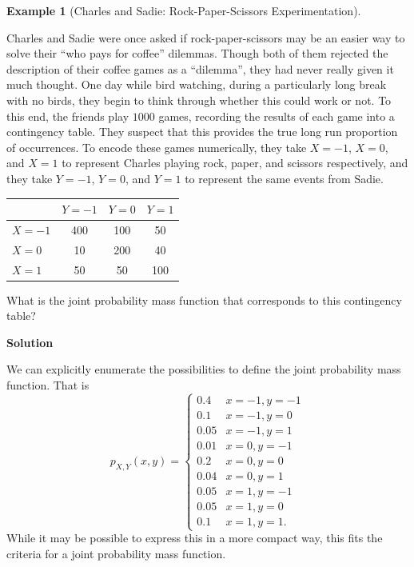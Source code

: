 \documentclass[
  letterpaper,
  DIV=11,
  numbers=noendperiod]{scrreprt}
\theoremstyle{definition}
\theoremstyle{definition}
\theoremstyle{definition}
\newtheorem{example}{Example}[chapter]
\theoremstyle{remark}
\begin{document}
\begin{example}[Charles and Sadie: Rock-Paper-Scissors
Experimentation]\protect\hypertarget{exm-contingency-table-as-joint-pmf}{}\label{exm-contingency-table-as-joint-pmf}

Charles and Sadie were once asked if rock-paper-scissors may be an
easier way to solve their ``who pays for coffee'' dilemmas. Though both
of them rejected the description of their coffee games as a ``dilemma'',
they had never really given it much thought. One day while bird
watching, during a particularly long break with no birds, they begin to
think through whether this could work or not. To this end, the friends
play \(1000\) games, recording the results of each game into a
contingency table. They suspect that this provides the true long run
proportion of occurrences. To encode these games numerically, they take
\(X = -1\), \(X=0\), and \(X=1\) to represent Charles playing rock,
paper, and scissors respectively, and they take \(Y = -1\), \(Y=0\), and
\(Y=1\) to represent the same events from Sadie.

\begin{longtable}[]{@{}lccc@{}}
\toprule\noalign{}
& \(Y=-1\) & \(Y = 0\) & \(Y = 1\) \\
\midrule\noalign{}
\endhead
\bottomrule\noalign{}
\endlastfoot
\(X=-1\) & 400 & 100 & 50 \\
\(X=0\) & 10 & 200 & 40 \\
\(X=1\) & 50 & 50 & 100 \\
\end{longtable}

What is the joint probability mass function that corresponds to this
contingency table?

\begin{tcolorbox}[enhanced jigsaw, colback=white, breakable, rightrule=.15mm, leftrule=.75mm, toprule=.15mm, left=2mm, arc=.35mm, opacityback=0, bottomrule=.15mm]

\vspace{-3mm}\textbf{Solution}\vspace{3mm}

We can explicitly enumerate the possibilities to define the joint
probability mass function. That is \[p_{X,Y}(x,y) = \begin{cases}
0.4 & x = -1, y = -1 \\
0.1 & x = -1, y = 0 \\
0.05 & x = -1, y = 1 \\
0.01 & x = 0, y = -1 \\
0.2 & x = 0, y = 0 \\
0.04 & x = 0, y = 1 \\
0.05 & x = 1, y = -1 \\
0.05 & x = 1, y = 0 \\
0.1 & x = 1, y = 1.
\end{cases}\] While it may be possible to express this in a more compact
way, this fits the criteria for a joint probability mass function.

\end{tcolorbox}

\end{example}
\end{document}
